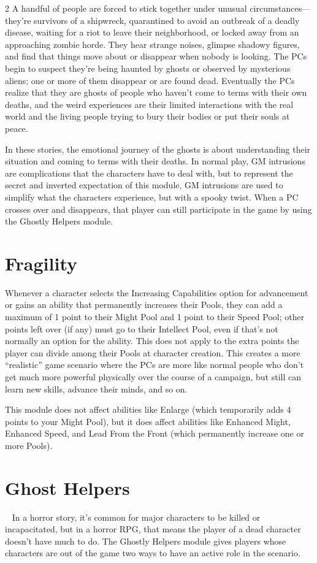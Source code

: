 \begin{multicols}{2}
A handful of people are forced to stick together under unusual circumstances—they’re survivors of a shipwreck, quarantined to avoid an outbreak of a deadly disease, waiting for a riot to leave their neighborhood, or locked away from an approaching zombie horde. They hear strange noises, glimpse shadowy figures, and find that things move about or disappear when nobody is looking. The PCs begin to suspect they’re being haunted by ghosts or observed by mysterious aliens; one or more of them disappear or are found dead. Eventually the PCs realize that they are ghosts of people who haven’t come to terms with their own deaths, and the weird experiences are their limited interactions with the real world and the living people trying to bury their bodies or put their souls at peace.

In these stories, the emotional journey of the ghosts is about understanding their situation and coming to terms with their deaths. In normal play, GM intrusions are complications that the characters have to deal with, but to represent the secret and inverted expectation of this module, GM intrusions are used to simplify what the characters experience, but with a spooky twist.
When a PC crosses over and disappears, that player can still participate in the game by using the Ghostly Helpers module.

\section{Fragility}

Whenever a character selects the Increasing Capabilities option for advancement or gains an ability that permanently increases their Pools, they can add a maximum of 1 point to their Might Pool and 1 point to their Speed Pool; other points left over (if any) must go to their Intellect Pool, even if that’s not normally an option for the ability. This does not apply to the extra points the player can divide among their Pools at character creation. This creates a more “realistic” game scenario where the PCs are more like normal people who don’t get much more powerful physically over the course of a campaign, but still can learn new skills, advance their minds, and so on.

This module does not affect abilities like Enlarge (which temporarily adds 4 points to your Might Pool), but it does affect abilities like Enhanced Might, Enhanced Speed, and Lead From the Front (which permanently increase one or more Pools).

\section{Ghost Helpers}
 
In a horror story, it’s common for major characters to be killed or incapacitated, but in a horror RPG, that means the player of a dead character doesn’t have much to do. The Ghostly Helpers module gives players whose characters are out of the game two ways to have an active role in the scenario.


\end{multicols}
